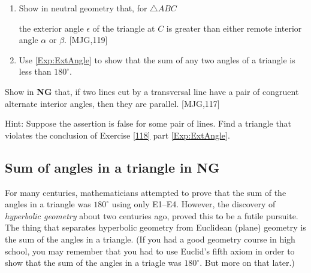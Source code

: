\documentclass{ximera}
\begin{document}
\begin{question}
\label{118} 
\begin{enumerate}
\item\label{Exp:ExtAngle} Show in neutral geometry that, for $\triangle ABC$
\begin{image}
\end{image}
the exterior angle $\epsilon$ of the triangle at $C$ is greater than either remote interior angle $\alpha$ or $\beta$. [MJG,119]
\item Use \ref{Exp:ExtAngle} to show that the sum of any two angles of a triangle is less than $180^{\circ}$.
\end{enumerate}
\end{question}

\begin{exploration}
Show in \textbf{NG} that, if two lines cut by a transversal line have
a pair of congruent alternate interior angles, then they are
parallel. [MJG,117]

Hint: Suppose the assertion is false for some pair of lines. Find a
triangle that violates the conclusion of Exercise \ref{118}
part \ref{Exp:ExtAngle}.
\end{exploration}












\subsection*{Sum of angles in a triangle in NG}


For many centuries, mathematicians attempted to prove that the sum of
the angles in a triangle was $180^{\circ}$ using only E1--E4. However,
the discovery of \textit{hyperbolic geometry} about two centuries ago,
proved this to be a futile pursuite. The thing that separates
hyperbolic geometry from Euclidean (plane) geometry is the sum of
the angles in a triangle. (If you had a good geometry course in high
school, you may remember that you had to use Euclid's fifth axiom in
order to show that the sum of the angles in a triagle was
$180^{\circ}.$ But more on that later.)
\end{document}
